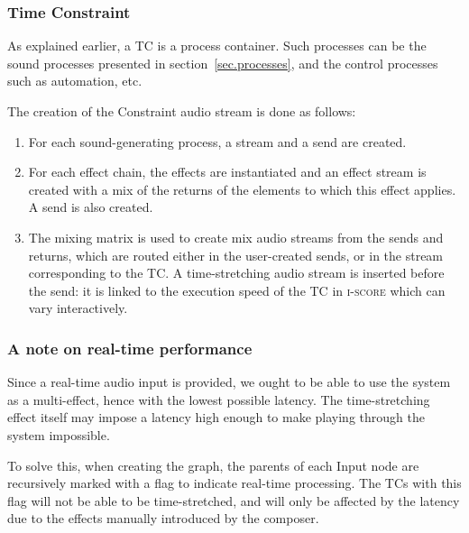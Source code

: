 \documentclass{article}
\newcommand*{\iscore}{\textsc{i-score}\xspace}
\newcommand*{\timeconstraint}{\ac{TC}\xspace}
\newcommand*{\timeconstraints}{\acp{TC}\xspace}
\begin{document}
\subsubsection{Time Constraint}
As explained earlier, a \timeconstraint is a process container.
Such processes can be the sound processes presented in section~\ref{sec.processes}, and 
the control processes such as automation, etc.

The creation of the Constraint audio stream is done as follows: 
\begin{enumerate}
    \item For each sound-generating process, a stream and a send are created.
    \item For each effect chain, the effects are instantiated and an effect stream is created with a mix of the returns of the elements to which this effect applies.
    A send is also created.
    \item The mixing matrix is used to create mix audio streams from the sends and returns, which are routed either in the user-created sends, or in the stream corresponding to the \timeconstraint.
    A time-stretching audio stream is inserted before the send: it is linked to the execution speed of the \timeconstraint in \iscore which can vary interactively.
\end{enumerate} 

\subsubsection{A note on real-time performance}
Since a real-time audio input is provided, we ought to be able to 
use the system as a multi-effect, hence with the lowest possible latency.
The time-stretching effect itself may impose a latency high enough to make 
playing through the system impossible.

To solve this, when creating the graph, the parents of each Input node are recursively marked 
with a flag to indicate real-time processing. 
The \timeconstraints with this flag will not be able to be time-stretched, and will only 
be affected by the latency due to the effects manually introduced by the composer.



\end{document}
